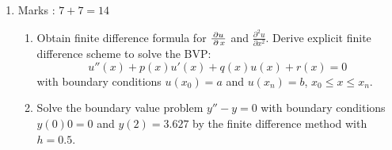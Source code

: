 \documentclass[12pt,class=book,crop=false]{standalone}
\begin{document}
\begin{enumerate}
\begin{enumerate}
          \end{enumerate}
    \item Marks : $ 7+7=14 $
          \begin{enumerate}
              \item Obtain finite difference formula for $ \frac{\partial u}{\,\partial\, x} $ and $ \frac{\partial^2 u }{\partial x^2} $. Derive explicit finite difference scheme to solve the BVP:
                    \[
                        u''(x)+p(x)u'(x)+q(x)u(x)+r(x)=0
                    \]
                    with boundary conditions $ u(x_0)=a $ and $ u(x_n)=b $, $ x_0\leq x\leq x_n $.
              \item Solve the boundary value problem $ y''-y=0 $ with boundary conditions $ y(0)0=0 $ and $ y(2)=3.627 $ by the finite difference method with $ h=0.5 $.
          \end{enumerate}
\end{enumerate}
\newpage
\end{document}
